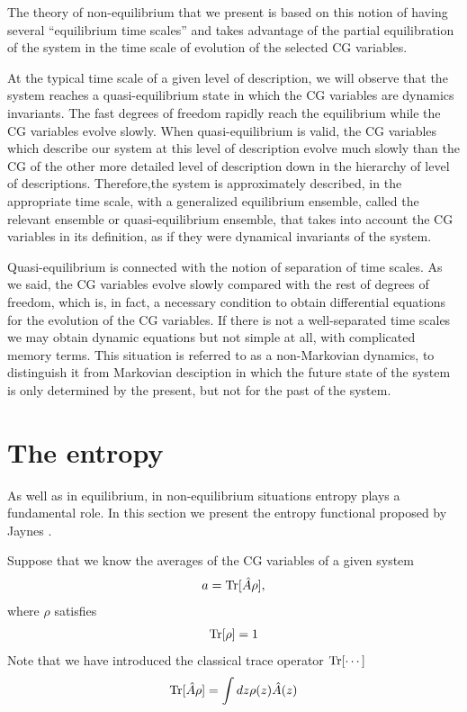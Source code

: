 \documentclass[a4paper,openright,12pt]{book}
\begin{document}
The theory of non-equilibrium that we present is based on this notion of
having several “equilibrium time scales” and takes advantage of the partial equilibration of
the system in the time scale of evolution of the selected CG variables.

At the typical time scale of a given level of description, we will observe that the system reaches a quasi-equilibrium state in which the CG variables are dynamics invariants. 
The fast degrees of freedom rapidly reach the equilibrium while the CG variables evolve slowly. 
When quasi-equilibrium is valid, the CG variables which describe our system at this level of description evolve much slowly than the CG of the other more detailed level of description down in the hierarchy of level of descriptions. 
Therefore,the system is approximately described, in the appropriate time scale, with a generalized equilibrium ensemble, called the relevant ensemble or quasi-equilibrium ensemble, that takes into account the CG variables in its definition, as if they were dynamical invariants of the system.

Quasi-equilibrium is connected with the notion of separation of time scales. As we said, the CG variables evolve slowly compared with the rest of degrees of freedom, which is, in fact, a necessary condition to obtain differential equations for the evolution of the CG variables. If there is not a well-separated time scales we may obtain dynamic equations but not simple at all, with complicated memory terms. This situation is referred to as a non-Markovian dynamics, to distinguish it from Markovian desciption in which the future state of the system is only determined by the present, but not for the past of the system. 

\section{The entropy}\label{sec:TheEntropy}
As well as in equilibrium, in non-equilibrium situations entropy plays a fundamental role. In this section we present the entropy functional proposed by Jaynes \cite{Jaynes1957}.

Suppose that we know the averages of the CG variables of a given system 
\begin{align}
    a = {\rm Tr}[{\hat{A}}\rho] ,
    \label{ave0}
\end{align}
where $\rho$ satisfies
\begin{align}
    {\rm Tr}[\rho] = 1
    \label{intrho}
\end{align}
Note that we have introduced the classical trace operator ${\rm Tr}[\cdots]$
\begin{align}
    {\rm Tr}[\hat{A}\rho] = \int dz\rho(z)\hat{A}(z) 
\end{align}
\end{document}
